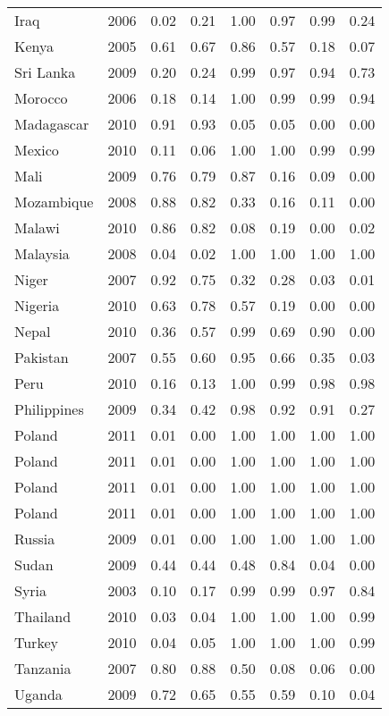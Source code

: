 \begin{longtable}[t]{lrrrrrrr}
Iraq & 2006 & 0.02 & 0.21 & 1.00 & 0.97 & 0.99 & 0.24\\
Kenya & 2005 & 0.61 & 0.67 & 0.86 & 0.57 & 0.18 & 0.07\\
Sri Lanka & 2009 & 0.20 & 0.24 & 0.99 & 0.97 & 0.94 & 0.73\\
Morocco & 2006 & 0.18 & 0.14 & 1.00 & 0.99 & 0.99 & 0.94\\
Madagascar & 2010 & 0.91 & 0.93 & 0.05 & 0.05 & 0.00 & 0.00\\
Mexico & 2010 & 0.11 & 0.06 & 1.00 & 1.00 & 0.99 & 0.99\\
Mali & 2009 & 0.76 & 0.79 & 0.87 & 0.16 & 0.09 & 0.00\\
Mozambique & 2008 & 0.88 & 0.82 & 0.33 & 0.16 & 0.11 & 0.00\\
Malawi & 2010 & 0.86 & 0.82 & 0.08 & 0.19 & 0.00 & 0.02\\
Malaysia & 2008 & 0.04 & 0.02 & 1.00 & 1.00 & 1.00 & 1.00\\
Niger & 2007 & 0.92 & 0.75 & 0.32 & 0.28 & 0.03 & 0.01\\
Nigeria & 2010 & 0.63 & 0.78 & 0.57 & 0.19 & 0.00 & 0.00\\
Nepal & 2010 & 0.36 & 0.57 & 0.99 & 0.69 & 0.90 & 0.00\\
Pakistan & 2007 & 0.55 & 0.60 & 0.95 & 0.66 & 0.35 & 0.03\\
Peru & 2010 & 0.16 & 0.13 & 1.00 & 0.99 & 0.98 & 0.98\\
Philippines & 2009 & 0.34 & 0.42 & 0.98 & 0.92 & 0.91 & 0.27\\
Poland & 2011 & 0.01 & 0.00 & 1.00 & 1.00 & 1.00 & 1.00\\
Poland & 2011 & 0.01 & 0.00 & 1.00 & 1.00 & 1.00 & 1.00\\
Poland & 2011 & 0.01 & 0.00 & 1.00 & 1.00 & 1.00 & 1.00\\
Poland & 2011 & 0.01 & 0.00 & 1.00 & 1.00 & 1.00 & 1.00\\
Russia & 2009 & 0.01 & 0.00 & 1.00 & 1.00 & 1.00 & 1.00\\
Sudan & 2009 & 0.44 & 0.44 & 0.48 & 0.84 & 0.04 & 0.00\\
Syria & 2003 & 0.10 & 0.17 & 0.99 & 0.99 & 0.97 & 0.84\\
Thailand & 2010 & 0.03 & 0.04 & 1.00 & 1.00 & 1.00 & 0.99\\
Turkey & 2010 & 0.04 & 0.05 & 1.00 & 1.00 & 1.00 & 0.99\\
Tanzania & 2007 & 0.80 & 0.88 & 0.50 & 0.08 & 0.06 & 0.00\\
Uganda & 2009 & 0.72 & 0.65 & 0.55 & 0.59 & 0.10 & 0.04\\

\end{longtable}
